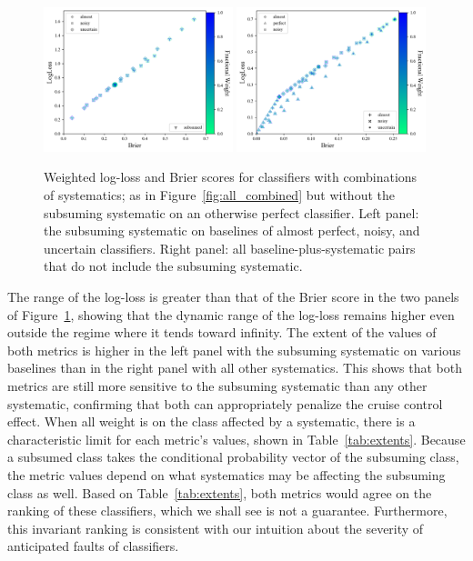 \begin{figure}
	\begin{center}
		\includegraphics[width=0.49\textwidth]{./fig/middle_zoom.png}
		\includegraphics[width=0.49\textwidth]{./fig/lower_zoom.png}
		\caption{Weighted log-loss and Brier scores for classifiers with combinations of systematics; as in Figure~\ref{fig:all_combined} but without the subsuming systematic on an otherwise perfect classifier.
		Left panel: the subsuming systematic on baselines of almost perfect, noisy, and uncertain classifiers.
		Right panel: all baseline-plus-systematic pairs that do not include the subsuming systematic.
		}
	\end{center}
	\label{fig:subsume}
\end{figure}

The range of the log-loss is greater than that of the Brier score in the two panels of Figure~\ref{fig:subsume}, showing that the dynamic range of the log-loss remains higher even outside the regime where it tends toward infinity.
The extent of the values of both metrics is higher in the left panel with the subsuming systematic on various baselines than in the right panel with all other systematics.
This shows that both metrics are still more sensitive to the subsuming systematic than any other systematic, confirming that both can appropriately penalize the cruise control effect.
When all weight is on the class affected by a systematic, there is a characteristic limit for each metric's values, shown in Table~\ref{tab:extents}.
Because a subsumed class takes the conditional probability vector of the subsuming class, the metric values depend on what systematics may be affecting the subsuming class as well.
Based on Table~\ref{tab:extents}, both metrics would agree on the ranking of these classifiers, which we shall see is not a guarantee.
Furthermore, this invariant ranking is consistent with our intuition about the severity of anticipated faults of classifiers.

